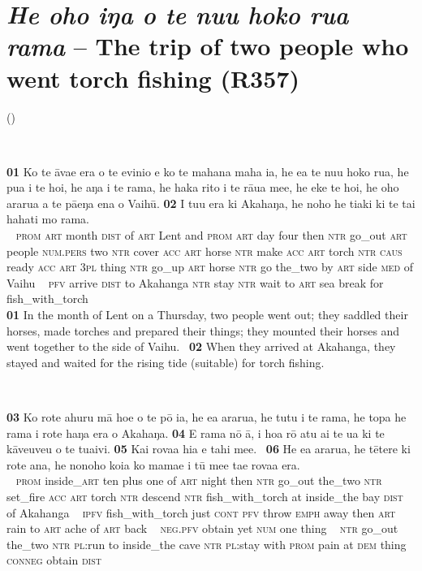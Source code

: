 \newpage
\section*{\textit{He oho iŋa o te nu{\ꞌ}u hoko rua rama} – The trip of two people who went torch fishing (R357)} \label{sec:a.3}
(\citealt[Vol. 5:22–23]{WeberWeber1990Mai})

~

\bigskip\gll
\textbf{\textup{01}} Ko te {\ꞌ}āva{\ꞌ}e era o te evinio {\ꞌ}e ko te mahana maha ia, he e{\ꞌ}a te nu{\ꞌ}u hoko rua, he pu{\ꞌ}a i te hoi, he aŋa i te rama, he haka rito i te rāua me{\ꞌ}e, he eke te hoi, he oho ararua a te pā{\ꞌ}eŋa ena o Vaihū. \textbf{\textup{02}} I tu{\ꞌ}u era ki {\ꞌ}Akahaŋa, he noho he tiaki ki te tai hahati mo rama.\\
~ \textsc{prom} \textsc{art} month \textsc{dist} of \textsc{art} Lent and \textsc{prom} \textsc{art} day four then \textsc{ntr} go\_out \textsc{art} people \textsc{num.pers} two \textsc{ntr} cover \textsc{acc} \textsc{art} horse \textsc{ntr} make \textsc{acc} \textsc{art} torch \textsc{ntr} \textsc{caus} ready \textsc{acc} \textsc{art} \textsc{3pl} thing \textsc{ntr} go\_up \textsc{art} horse \textsc{ntr} go the\_two by \textsc{art} side \textsc{med} of Vaihu ~ \textsc{pfv} arrive \textsc{dist} to Akahanga \textsc{ntr} stay \textsc{ntr} wait to \textsc{art} sea break for fish\_with\_torch\\

\medskip\glt
\textbf{\textup{01}} In the month of Lent on a Thursday, two people went out; they saddled their horses, made torches and prepared their things; they mounted their horses and went together to the side of Vaihu. ~\textbf{\textup{02}} When they arrived at Akahanga, they stayed and waited for the rising tide (suitable) for torch fishing.


~

\bigskip\gll
\textbf{\textup{03}} Ko rote {\ꞌ}ahuru mā ho{\ꞌ}e o te pō ia, he e{\ꞌ}a ararua, he tutu i te rama, he topa he rama {\ꞌ}i rote haŋa era o {\ꞌ}Akahaŋa. \textbf{\textup{04}} E rama nō {\ꞌ}ā, i hoa rō atu ai te {\ꞌ}ua ki te kāve{\ꞌ}uve{\ꞌ}u o te tua{\ꞌ}ivi. \textbf{\textup{05}} Kai rova{\ꞌ}a hia e tahi me{\ꞌ}e. ~\textbf{\textup{06}} He e{\ꞌ}a ararua, he tētere ki rote {\ꞌ}ana, he nonoho koia ko mamae {\ꞌ}i tū me{\ꞌ}e ta{\ꞌ}e rova{\ꞌ}a era.\\
~ \textsc{prom} inside\_\textsc{art} ten plus one of \textsc{art} night then \textsc{ntr} go\_out the\_two \textsc{ntr} set\_fire \textsc{acc} \textsc{art} torch \textsc{ntr} descend \textsc{ntr} fish\_with\_torch at inside\_the bay \textsc{dist} of Akahanga  ~ \textsc{ipfv} fish\_with\_torch just \textsc{cont} \textsc{pfv} throw \textsc{emph} away then \textsc{art} rain to \textsc{art} ache of \textsc{art} back ~ \textsc{neg.pfv} obtain yet \textsc{num} one thing ~ \textsc{ntr} go\_out the\_two \textsc{ntr} \textsc{pl}:run to inside\_the cave \textsc{ntr} \textsc{pl}:stay with \textsc{prom} pain at \textsc{dem} thing \textsc{conneg} obtain \textsc{dist}\\

